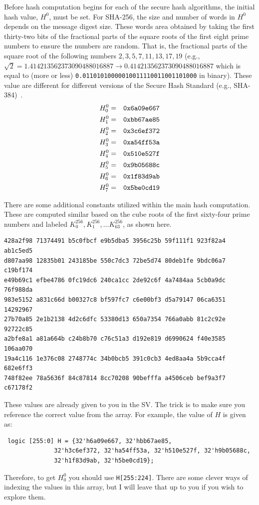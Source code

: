 \documentclass{article}
\begin{document}
Before hash computation begins for each of the secure hash algorithms,
the initial hash value,
$H^0$, must be set. For SHA-256, the size and number of words in $H^0$
depends on the message digest size.  These words area obtained by
taking the first thirty-two bits of the fractional parts of the square
roots of the first eight prime numbers to ensure the numbers are
random.  That is, the fractional parts of the square root of the following numbers
$2, 3, 5, 7, 11, 13, 17, 19$ (e.g., $\sqrt{2} = 1.414213562373090488016887
\rightarrow 0.414213562373090488016887$ which is equal to (more or less)
\verb!0.01101010000010011110011001101000! in binary).
These value are different for different versions of the Secure
Hash Standard (e.g., SHA-384)~\cite{1250396}.
\begin{eqnarray*}
  H_0^0 & = & \verb!0x6a09e667!\\
  H_1^0 & = & \verb!0xbb67ae85!\\
  H_2^0 & = & \verb!0x3c6ef372!\\
  H_3^0 & = & \verb!0xa54ff53a!\\
  H_4^0 & = & \verb!0x510e527f!\\
  H_5^0 & = & \verb!0x9b05688c!\\
  H_6^0 & = & \verb!0x1f83d9ab!\\
  H_7^0 & = & \verb!0x5be0cd19!\\
\end{eqnarray*}

There are some additional constants utilized within the main hash
computation.  These are computed similar based on the cube roots of
the first sixty-four prime numbers and labeled
$K_0^{256}, K_1^{256}, \ldots K_{63}^{256}$, as shown here.
\begin{verbatim}
428a2f98 71374491 b5c0fbcf e9b5dba5 3956c25b 59f111f1 923f82a4 ab1c5ed5
d807aa98 12835b01 243185be 550c7dc3 72be5d74 80deb1fe 9bdc06a7 c19bf174
e49b69c1 efbe4786 0fc19dc6 240ca1cc 2de92c6f 4a7484aa 5cb0a9dc 76f988da
983e5152 a831c66d b00327c8 bf597fc7 c6e00bf3 d5a79147 06ca6351 14292967
27b70a85 2e1b2138 4d2c6dfc 53380d13 650a7354 766a0abb 81c2c92e 92722c85
a2bfe8a1 a81a664b c24b8b70 c76c51a3 d192e819 d6990624 f40e3585 106aa070
19a4c116 1e376c08 2748774c 34b0bcb5 391c0cb3 4ed8aa4a 5b9cca4f 682e6ff3
748f82ee 78a5636f 84c87814 8cc70208 90befffa a4506ceb bef9a3f7 c67178f2
\end{verbatim}

These values are already given to you in the SV.  The trick is to make
sure you reference the correct value from the array.  For example, the
value of $H$ is given as:
\begin{verbatim}
 logic [255:0] H = {32'h6a09e667, 32'hbb67ae85,
		      32'h3c6ef372, 32'ha54ff53a, 32'h510e527f, 32'h9b05688c,
		      32'h1f83d9ab, 32'h5be0cd19};
\end{verbatim}
Therefore, to get $H_0^0$ you should  use \verb!H[255:224]!.  There are
some clever ways of indexing the values in this array, but I will
leave that up to you if you wish to explore them.
\end{document}
